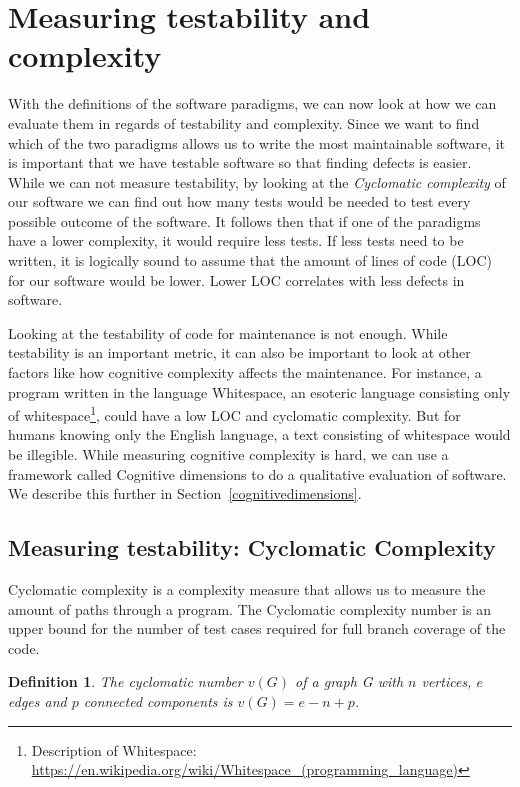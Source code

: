 \documentclass[12pt]{report}
\newtheorem*{definition}{Definition}
\theoremstyle{definition}
\theoremstyle{theorem}
\begin{document}
\section{Measuring testability and complexity}\label{measuretestability}

With the definitions of the software paradigms, we can now look at how we can
evaluate them in regards of testability and complexity. Since we want to find
which of the two paradigms allows us to write the most maintainable software, it
is important that we have testable software so that finding defects is easier.
While we can not measure testability, by looking at the \textit{Cyclomatic
complexity} of our software we can find out how many tests would be needed to
test every possible outcome of the software. It follows then that if one of the
paradigms have a lower complexity, it would require less tests. If less tests
need to be written, it is logically sound to assume that the amount of lines of
code (LOC) for our software would be lower. Lower LOC correlates with less
defects in software.~\cite{defectloc} 

Looking at the testability of code for maintenance is not enough. While
testability is an important metric, it can also be important to look at other
factors like how cognitive complexity affects the maintenance. For instance, a
program written in the language Whitespace, an esoteric language consisting only
of whitespace\footnote{Description of Whitespace:
\url{https://en.wikipedia.org/wiki/Whitespace_(programming_language)}}, could
have a low LOC and cyclomatic complexity. But for humans knowing only the
English language, a text consisting of whitespace would be illegible. While
measuring cognitive complexity is hard, we can use a framework called Cognitive
dimensions to do a qualitative evaluation of software. We describe this further
in Section~\ref{cognitivedimensions}.


\subsection{Measuring testability: Cyclomatic Complexity}\label{cyclomaticcomplexity}

Cyclomatic complexity is a complexity measure that allows us to measure the
amount of paths through a program. The Cyclomatic complexity number is an upper
bound for the number of test cases required for full branch coverage of the
code. 

\theoremstyle{definition}
\begin{definition}
The cyclomatic number $v(G)$ of a graph G with $n$ vertices, $e$ edges and $p$
connected components is $v(G) = e - n + p$.
\end{definition}
\end{document}
